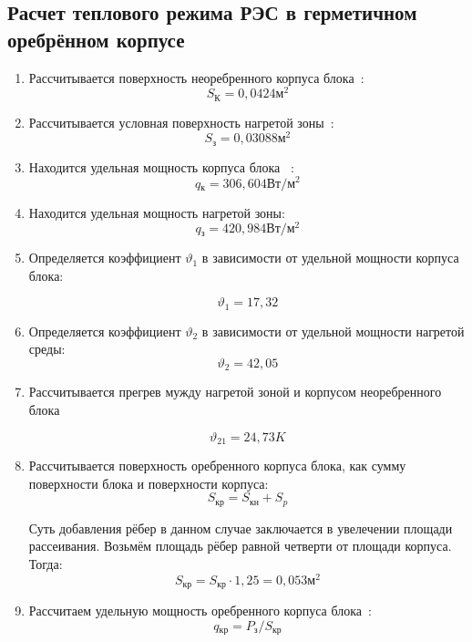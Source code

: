 \subsection{Расчет теплового режима РЭС в герметичном оребрённом
  корпусе}
\begin{enumerate}[label={\arabic*.}]

\item Рассчитывается поверхность неоребренного корпуса
  блока~\cite{Rotkop1976}: %
  $$S\mathrm{_{К}}=0,0424\mathrm{м^2}$$

\item Рассчитывается условная поверхность нагретой
  зоны~\cite{Rotkop1976}: %
  $$S\mathrm{_{з}} = 0,03088\mathrm{м^2}$$ 

\item Находится удельная мощность корпуса
  блока ~\cite{Rotkop1976}:  %
  $$q\mathrm{_к} = 306,604\mathrm{Вт/м^2}$$

\item Находится удельная мощность нагретой
  зоны: %
  $$q\mathrm{_з} = 420,984 \mathrm{ Вт/м^2}$$

\item Определяется коэффициент $\vartheta_1$ в зависимости от
  удельной мощности корпуса блока:

  $$\vartheta_1=17,32$$
\item Определяется коэффициент $\vartheta_2$ в зависимости от удельной мощности нагретой среды:
  $$\vartheta_2=42,05$$

\item Рассчитывается прегрев мужду нагретой зоной и корпусом
неоребренного блока

$$\vartheta_{21} = 24,73 K$$

\item Рассчитывается поверхность оребренного корпуса блока,
  как сумму поверхности блока и поверхности корпуса:
  \begin{equation}
    S\mathrm{_{кр}} = S\mathrm{_{кн}} + S_{p}
  \end{equation}

Суть добавления рёбер в данном случае заключается в увелечении площади
рассеивания. Возьмём площадь рёбер равной четверти от площади
корпуса. Тогда:
$$S\mathrm{_{кр}} = S\mathrm{_{кр}} \cdot 1,25 = 0,053\mathrm{м^2}$$

\item Рассчитаем удельную мощность оребренного
  корпуса блока~\cite{Rotkop1976}:
  \begin{equation}
      q\mathrm{_{кр}} = P\mathrm{_{з}} / S\mathrm{_{кр}}
    \end{equation}
    

\end{enumerate}
